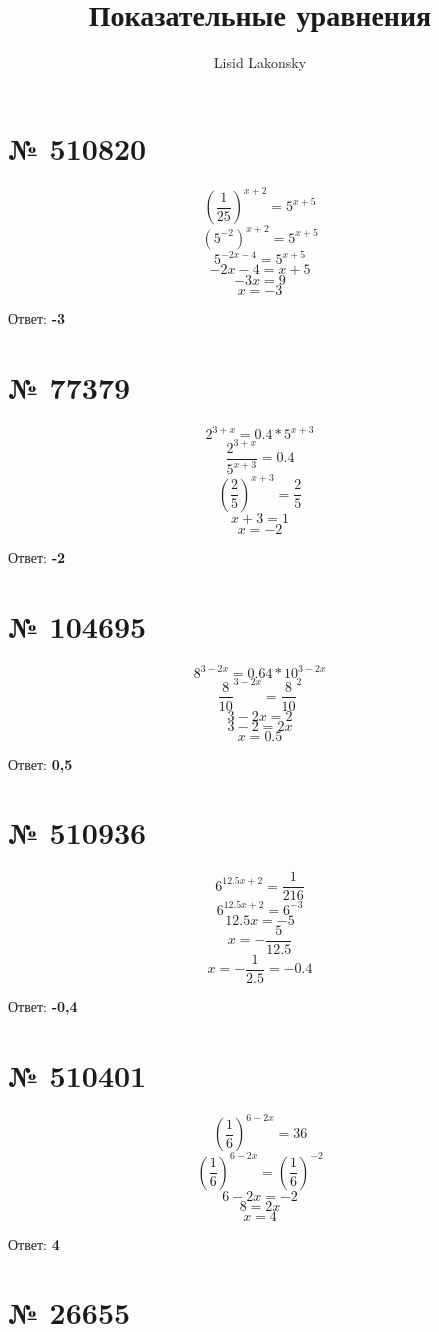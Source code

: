 \documentclass[11pt]{article} %
\title{Показательные уравнения}
\author{Lisid Lakonsky}
\begin{document}
\maketitle

\section{№ \textbf{510820}}

$$(\frac{1}{25})^{x+2} = 5^{x + 5}$$
$$(5^{-2})^{x+2} = 5^{x + 5}$$
$$5^{-2x - 4} = 5^{x + 5}$$
$$-2x - 4 = x + 5$$
$$-3x = 9$$
$$x = -3$$

Ответ: \textbf{-3}

\section{№ \textbf{77379}}

$$2^{3 + x} = 0.4 * 5^{x + 3}$$
$$\frac{2^{3+x}}{5^{x+3}} = 0.4$$
$$(\frac{2}{5})^{x+3} = \frac{2}{5}$$
$$x + 3 = 1$$
$$x = -2$$

Ответ:\textbf{ -2}

\section{№ \textbf{104695}}

$$8^{3 - 2x} = 0.64 * 10^{3 - 2x}$$
$$\frac{8}{10}^{3 - 2x} = \frac{8}{10}^2$$
$$3-2x = 2$$
$$3 - 2 = 2x$$
$$x = 0.5$$

Ответ: \textbf{0,5}

\section{№ \textbf{510936}}

$$6^{12.5x + 2} = \frac{1}{216}$$
$$6^{12.5x + 2} = 6^{-3}$$
$$12.5x = -5$$
$$x = -\frac{5}{12.5}$$
$$x = -\frac{1}{2.5} = -0.4$$

Ответ: \textbf{-0,4}

\section{№ \textbf{510401}}

$$(\frac{1}{6})^{6 - 2x} = 36$$
$$(\frac{1}{6})^{6 - 2x} = (\frac{1}{6})^{-2}$$
$$6 - 2x = -2$$
$$8 = 2x$$
$$x = 4$$

Ответ: \textbf{4}

\section{№ \textbf{26655}}
\end{document}
